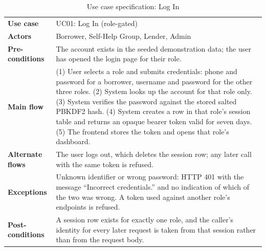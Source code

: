 \documentclass[11pt,a4paper]{article}
\begin{document}
\begin{table}[H]
\centering
\caption{Use case specification: Log In}
\label{tab:uc1}
\small
\begin{tabular}{@{}L{3.1cm}L{11.3cm}@{}}
\toprule
\textbf{Use case} & UC01: Log In (role-gated)\\
\textbf{Actors} & Borrower, Self-Help Group, Lender, Admin\\
\textbf{Pre-conditions} & The account exists in the seeded demonstration data; the user has opened the login page for their role.\\
\textbf{Main flow} & (1) User selects a role and submits credentials: phone and password for a borrower, username and password for the other three roles. (2) System looks up the account for that role only. (3) System verifies the password against the stored salted PBKDF2 hash. (4) System creates a row in that role's session table and returns an opaque bearer token valid for seven days. (5) The frontend stores the token and opens that role's dashboard.\\
\textbf{Alternate flows} & The user logs out, which deletes the session row; any later call with the same token is refused.\\
\textbf{Exceptions} & Unknown identifier or wrong password: HTTP 401 with the message ``Incorrect credentials.'' and no indication of which of the two was wrong. A token used against another role's endpoints is refused.\\
\textbf{Post-conditions} & A session row exists for exactly one role, and the caller's identity for every later request is taken from that session rather than from the request body.\\
\bottomrule
\end{tabular}
\end{table}
\end{document}
